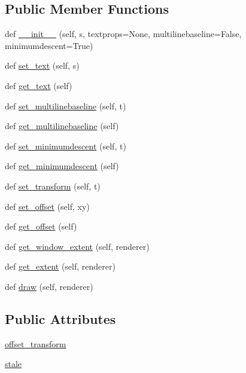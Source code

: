 \subsection*{Public Member Functions}
\begin{DoxyCompactItemize}
\item 
def \hyperlink{classmatplotlib_1_1offsetbox_1_1TextArea_ac71264e145ecf21220e76b356702ffdb}{\+\_\+\+\_\+init\+\_\+\+\_\+} (self, s, textprops=None, multilinebaseline=False, minimumdescent=True)
\item 
def \hyperlink{classmatplotlib_1_1offsetbox_1_1TextArea_a7acb6eb3b2f2dce00c07291f4718194f}{set\+\_\+text} (self, s)
\item 
def \hyperlink{classmatplotlib_1_1offsetbox_1_1TextArea_a3410a2d154f2e08753252b20956ccb39}{get\+\_\+text} (self)
\item 
def \hyperlink{classmatplotlib_1_1offsetbox_1_1TextArea_a84eec6c537cb96e1ef48e4ec5c2a2011}{set\+\_\+multilinebaseline} (self, t)
\item 
def \hyperlink{classmatplotlib_1_1offsetbox_1_1TextArea_a0ed4b54d2388fd77f00395350043882e}{get\+\_\+multilinebaseline} (self)
\item 
def \hyperlink{classmatplotlib_1_1offsetbox_1_1TextArea_a9da29c75e024bbf623cd53a736dea6f5}{set\+\_\+minimumdescent} (self, t)
\item 
def \hyperlink{classmatplotlib_1_1offsetbox_1_1TextArea_a8184ba192729c7c697f20d0735d000cd}{get\+\_\+minimumdescent} (self)
\item 
def \hyperlink{classmatplotlib_1_1offsetbox_1_1TextArea_a7b92c6ccb364d2720800b92481fa6693}{set\+\_\+transform} (self, t)
\item 
def \hyperlink{classmatplotlib_1_1offsetbox_1_1TextArea_a73902ef7200697a0d3b71030bf153f9f}{set\+\_\+offset} (self, xy)
\item 
def \hyperlink{classmatplotlib_1_1offsetbox_1_1TextArea_abd1148d17e19b2ec5a46c44f7f48dc5b}{get\+\_\+offset} (self)
\item 
def \hyperlink{classmatplotlib_1_1offsetbox_1_1TextArea_a9dadf5d6083e6171a9e4f607f8cbf030}{get\+\_\+window\+\_\+extent} (self, renderer)
\item 
def \hyperlink{classmatplotlib_1_1offsetbox_1_1TextArea_a7314aa1497249edc40ced6501d14609f}{get\+\_\+extent} (self, renderer)
\item 
def \hyperlink{classmatplotlib_1_1offsetbox_1_1TextArea_a8cf9ee8e94d8c91c029c3175aba52d3f}{draw} (self, renderer)
\end{DoxyCompactItemize}
\subsection*{Public Attributes}
\begin{DoxyCompactItemize}
\item 
\hyperlink{classmatplotlib_1_1offsetbox_1_1TextArea_aafcc9664ffe6a4460f92093043647e0d}{offset\+\_\+transform}
\item 
\hyperlink{classmatplotlib_1_1offsetbox_1_1TextArea_acd7558a0c039e4f4a3be15777b64e4d9}{stale}
\end{DoxyCompactItemize}


